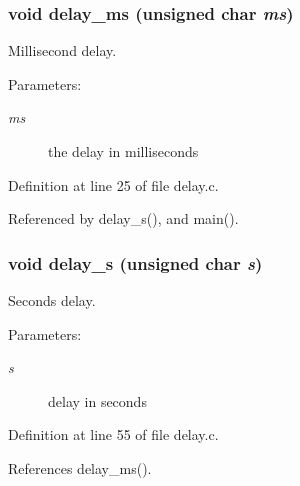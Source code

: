 \subsubsection[{delay\_\-ms}]{\setlength{\rightskip}{0pt plus 5cm}void delay\_\-ms (unsigned char {\em ms})}\label{delay_8h_7536158d6dfffb85a2bbb93957957a9d}


Millisecond delay. 

\begin{Desc}
\item[Parameters:]
\begin{description}
\item[{\em ms}]the delay in milliseconds \end{description}
\end{Desc}


Definition at line 25 of file delay.c.

Referenced by delay\_\-s(), and main().
\subsubsection[{delay\_\-s}]{\setlength{\rightskip}{0pt plus 5cm}void delay\_\-s (unsigned char {\em s})}\label{delay_8h_277087cfe043ab9daa62dd6d42c806e8}


Seconds delay. 

\begin{Desc}
\item[Parameters:]
\begin{description}
\item[{\em s}]delay in seconds \end{description}
\end{Desc}


Definition at line 55 of file delay.c.

References delay\_\-ms().